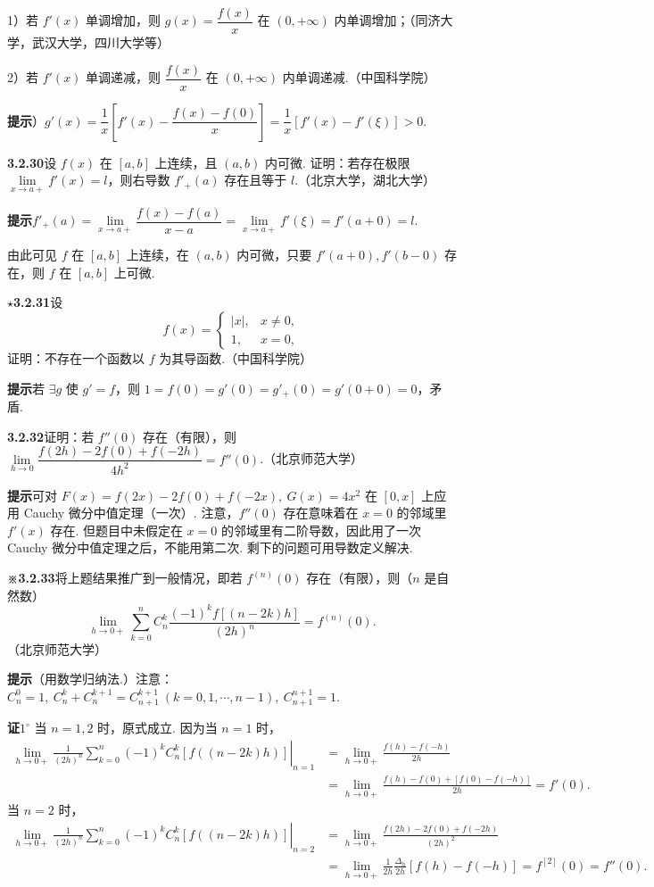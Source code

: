 \documentclass[UTF8, 12pt, fontset=fandol, oneside]{ctexart}
\begin{document}
1）若 $f'(x)$ 单调增加，则 $g(x)=\dfrac{f(x)}x$ 在 $(0,+\infty)$ 内单调增加；（同济大学，武汉大学，四川大学等）

2）若 $f'(x)$ 单调递减，则 $\dfrac{f(x)}x$ 在 $(0,+\infty)$ 内单调递减.（中国科学院）

\noindent\textbf{提示}）$g'(x)=\dfrac1x\left[f'(x)-\dfrac{f(x)-f(0)}x\right]=\dfrac1x[f'(x)-f'(\xi)]>0$.

\noindent\textbf{3.2.30}\quad 设 $f(x)$ 在 $[a,b]$ 上连续，且 $(a,b)$ 内可微. 证明：若存在极限 $\lim\limits_{x\to a+}f'(x)=l$，则右导数 $f'_+(a)$ 存在且等于 $l$.（北京大学，湖北大学）

\noindent\textbf{提示}\quad $f'_+(a)=\lim\limits_{x\to a+}\dfrac{f(x)-f(a)}{x-a}=\lim\limits_{x\to a+}f'(\xi)=f'(a+0)=l$.

由此可见 $f$ 在 $[a,b]$ 上连续，在 $(a,b)$ 内可微，只要 $f'(a+0),f'(b-0)$ 存在，则 $f$ 在 $[a,b]$ 上可微.

\noindent\textbf{$\star$3.2.31}\quad 设
\[
  f(x)=
  \begin{cases}
    |x|,& x\ne0,\\
    1,& x=0,
  \end{cases}
\]
证明：不存在一个函数以 $f$ 为其导函数.（中国科学院）

\noindent\textbf{提示}\quad 若 $\exists g$ 使 $g'=f$，则 $1=f(0)=g'(0)=g'_+(0)=g'(0+0)=0$，矛盾.

\noindent\textbf{3.2.32}\quad 证明：若 $f''(0)$ 存在（有限），则 $\lim\limits_{h\to0}\dfrac{f(2h)-2f(0)+f(-2h)}{4h^2}=f''(0)$.（北京师范大学）

\noindent\textbf{提示}\quad 可对 $F(x)=f(2x)-2f(0)+f(-2x),\ G(x)=4x^2$ 在 $[0,x]$ 上应用 Cauchy 微分中值定理（一次）. 注意，$f''(0)$ 存在意味着在 $x=0$ 的邻域里 $f'(x)$ 存在. 但题目中未假定在 $x=0$ 的邻域里有二阶导数，因此用了一次 Cauchy 微分中值定理之后，不能用第二次. 剩下的问题可用导数定义解决.

\noindent\textbf{※3.2.33}\quad 将上题结果推广到一般情况，即若 $f^{(n)}(0)$ 存在（有限），则（$n$ 是自然数）
\[
  \lim_{h\to0+}\sum_{k=0}^n C_n^k\frac{(-1)^k f[(n-2k)h]}{(2h)^n}=f^{(n)}(0).
\]
（北京师范大学）

\noindent\textbf{提示}\quad （用数学归纳法.）注意：$C_n^0=1,\ C_n^k+C_n^{k+1}=C_{n+1}^{k+1}\ (k=0,1,\cdots,n-1),\ C_{n+1}^{n+1}=1$.

\noindent\textbf{证}\quad $1^\circ$ 当 $n=1,2$ 时，原式成立. 因为当 $n=1$ 时，
\[
\begin{aligned}
\left.\lim_{h\to0+}\frac1{(2h)^n}\sum_{k=0}^n(-1)^kC_n^k[f((n-2k)h)]\right|_{n=1}
&=\lim_{h\to0+}\frac{f(h)-f(-h)}{2h}\\
&=\lim_{h\to0+}\frac{f(h)-f(0)+[f(0)-f(-h)]}{2h}
=f'(0).
\end{aligned}
\]
当 $n=2$ 时，
\[
\begin{aligned}
\left.\lim_{h\to0+}\frac1{(2h)^n}\sum_{k=0}^n(-1)^kC_n^k[f((n-2k)h)]\right|_{n=2}
&=\lim_{h\to0+}\frac{f(2h)-2f(0)+f(-2h)}{(2h)^2}\\
&=\lim_{h\to0+}\frac1{2h}\frac{\Delta_h}{2h}[f(h)-f(-h)]
=f^{[2]}(0)=f''(0).
\end{aligned}
\]
\end{document}
